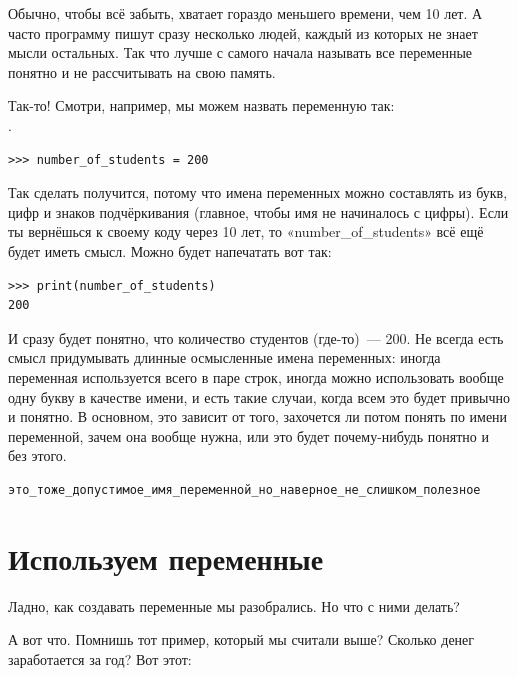Обычно, чтобы всё забыть, хватает гораздо меньшего времени, чем 10 лет. А часто программу пишут сразу несколько людей, каждый из которых не знает мысли остальных. Так что лучше с самого начала называть все переменные понятно и не рассчитывать на свою память.

Так-то! Смотри, например, мы можем назвать переменную так:\\.

\begin{listing}
\begin{verbatim}
>>> number_of_students = 200
\end{verbatim}
\end{listing}

Так сделать получится, потому что имена переменных можно составлять из букв, цифр и знаков подчёркивания (главное, чтобы имя не начиналось с цифры). Если ты вернёшься к своему коду через 10 лет, то «number\_of\_students» всё ещё будет иметь смысл.  Можно будет напечатать вот так:

\begin{listing}
\begin{verbatim}
>>> print(number_of_students)
200
\end{verbatim}
\end{listing}

И сразу будет понятно, что количество студентов (где-то) — 200. Не всегда есть смысл придумывать длинные осмысленные имена переменных: иногда переменная используется всего в паре строк, иногда можно использовать вообще одну букву в качестве имени, и есть такие случаи, когда всем это будет привычно и понятно. В основном, это зависит от того, захочется ли потом понять по имени переменной, зачем она вообще нужна, или это будет почему-нибудь понятно и без этого.

\begin{listing}
\begin{verbatim}
это_тоже_допустимое_имя_переменной_но_наверное_не_слишком_полезное
\end{verbatim}
\end{listing}

\section{Используем переменные}

Ладно, как создавать переменные мы разобрались. Но что с ними делать?

А вот что. Помнишь тот пример, который мы считали выше? Сколько денег заработается за год? Вот этот:

